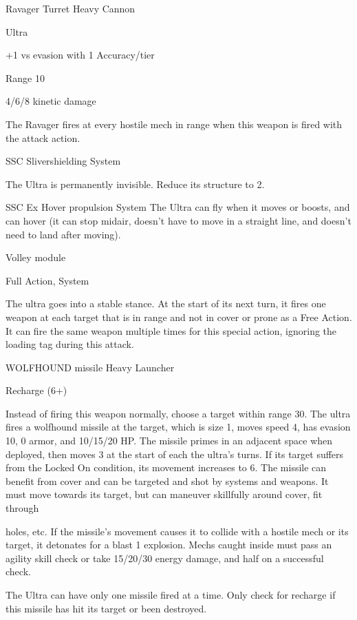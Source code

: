 Ravager Turret  
Heavy Cannon
 
Ultra
 
+1 vs evasion with 1 Accuracy/tier
 
Range 10
 
4/6/8 kinetic damage
 
The Ravager fires at every hostile mech in range when this weapon is fired with the attack action.
 

SSC Slivershielding  
System
 
The Ultra is permanently invisible. Reduce its structure to 2.
 

SSC Ex Hover propulsion  
System  
The Ultra can fly when it moves or boosts, and can hover (it can stop midair, doesn’t have to  
move in a straight line, and doesn’t need to land after moving).
 

Volley module
 
Full Action, System
 
The ultra goes into a stable stance. At the start of its next turn, it fires one weapon at each target  
that is in range and not in cover or prone as a Free Action. It can fire the same weapon multiple  
times for this special action, ignoring the loading tag during this attack.
 

WOLFHOUND missile  
Heavy Launcher
 
Recharge (6+)
 
Instead of firing this weapon normally, choose a target within range 30. The ultra fires a  
wolfhound missile at the target, which is size 1, moves speed 4, has evasion 10, 0 armor, and  
10/15/20 HP. The missile primes in an adjacent space when deployed, then moves 3 at the start  
of each the ultra’s turns. If its target suffers from the Locked On condition, its movement  
increases to 6. The missile can benefit from cover and can be targeted and shot by systems and  
weapons. It must move towards its target, but can maneuver skillfully around cover, fit through  

                                                                                                            


holes, etc. If the missile’s movement causes it to collide with a hostile mech or its target, it  
detonates for a blast 1 explosion. Mechs caught inside must pass an agility skill check or take  
15/20/30 energy damage, and half on a successful check.
 

The Ultra can have only one missile fired at a time. Only check for recharge if this missile has hit  
its target or been destroyed.
